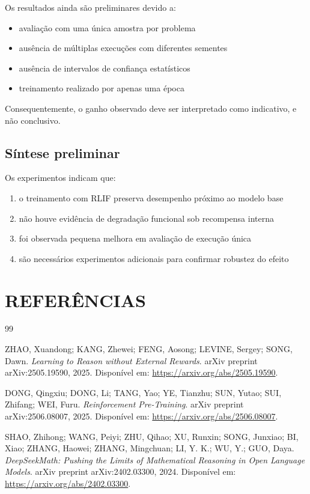 \documentclass[11pt,a4paper]{article}
\begin{document}
Os resultados ainda são preliminares devido a:

\begin{itemize}
\item avaliação com uma única amostra por problema
\item ausência de múltiplas execuções com diferentes sementes
\item ausência de intervalos de confiança estatísticos
\item treinamento realizado por apenas uma época
\end{itemize}

Consequentemente, o ganho observado deve ser interpretado como indicativo, e não conclusivo.

\subsection{Síntese preliminar}

Os experimentos indicam que:

\begin{enumerate}
\item o treinamento com RLIF preserva desempenho próximo ao modelo base
\item não houve evidência de degradação funcional sob recompensa interna
\item foi observada pequena melhora em avaliação de execução única
\item são necessários experimentos adicionais para confirmar robustez do efeito
\end{enumerate}


\section{REFERÊNCIAS}

\begin{thebibliography}{99}

ZHAO, Xuandong; KANG, Zhewei; FENG, Aosong; LEVINE, Sergey; SONG, Dawn.
\textit{Learning to Reason without External Rewards}.
arXiv preprint arXiv:2505.19590, 2025.
Disponível em: \url{https://arxiv.org/abs/2505.19590}. 

DONG, Qingxiu; DONG, Li; TANG, Yao; YE, Tianzhu; SUN, Yutao; SUI, Zhifang; WEI, Furu.
\textit{Reinforcement Pre-Training}.
arXiv preprint arXiv:2506.08007, 2025.
Disponível em: \url{https://arxiv.org/abs/2506.08007}. 

SHAO, Zhihong; WANG, Peiyi; ZHU, Qihao; XU, Runxin; SONG, Junxiao; BI, Xiao; 
ZHANG, Haowei; ZHANG, Mingchuan; LI, Y. K.; WU, Y.; GUO, Daya.
\textit{DeepSeekMath: Pushing the Limits of Mathematical Reasoning in Open Language Models}.
arXiv preprint arXiv:2402.03300, 2024.
Disponível em: \url{https://arxiv.org/abs/2402.03300}. 

\end{thebibliography}

\noindent
\end{document}
